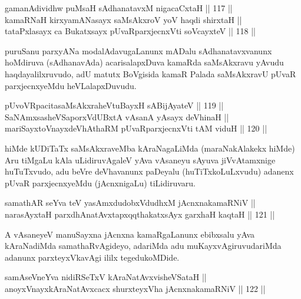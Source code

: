 
\begin{shl}
gamanAdividhw puMsaH sAdhanatavxM nigacaCxtaH \hfill || 117 ||  \\
kamaRNaH kirxyamANasayx saMsAkxroV yoV haqdi shirxtaH || \\
tataPxlasayx ca Bukatxsayx pUvaRparxjecnxVti soVcayxteV \hfill || 118 ||  
\end{shl}

\begin{artha}
puruSanu parxyANa modalAdavugaLanunx mADalu sAdhanatavxvanunx
hoMdiruva (sAdhanavAda) acarisalapxDuva kamaRda saMsAkxravu yAvudu
haqdayalilxruvudo, adU matutx BoVgisida kamaR Palada saMsAkxravU pUvaR
parxjecnxyeMdu heVLalapxDuvudu.
\end{artha}

\begin{shl}
pUvoVRpacitasaMsAkxraheVtuBayxH sA\s BijAyateV \hfill || 119 || \\
SaNAmxsasheVSaporxVdUBxtA vAsanA yA\s sayx deVhinaH || \\
mariSayxtoV\s nayxdeVhAthaRM pUvaRparxjecnxVti tAM viduH \hfill || 120 ||  
\end{shl}

\begin{artha}
hiMde kUDiTaTx saMsAkxraveMba kAraNagaLiMda (maraNakAlakekx hiMde) Aru
tiMgaLu kAla uLidiruvAgaleV yAva vAsaneyu sAyuva jiVvAtamxnige
huTuTxvudo, adu beVre deVhavanunx paDeyalu (huTiTxkoLuLxvudu) adanenx
pUvaR parxjecnxyeMdu (jAcnxnigaLu) tiLidiruvaru.
\end{artha}

\begin{shl}
samathAR seYva teV yasAmxdudobxVdudhxM jAcnxnakamaRNiV || \\
narasAyxtaH parxdhAnatAvxtapxqqthakatxsAyx garxhaH kaqtaH \hfill || 121 ||  
\end{shl}

\begin{artha}
A vAsaneyeV manuSayxna jAcnxna kamaRgaLanunx ebibxsalu yAva
kAraNadiMda samathaRvAgideyo, adariMda adu muKayxvAgiruvudariMda
adanunx parxteyxVkavAgi ililx tegedukoMDide.
\end{artha}


\begin{shl}
samAseVneYva nidiRSeTxV kAraNatAvxvisheVSataH || \\
anoyxVnayxkAraNatAvxcacx shurxteyxVha jAcnxnakamaRNiV \hfill || 122 ||  
\end{shl}

